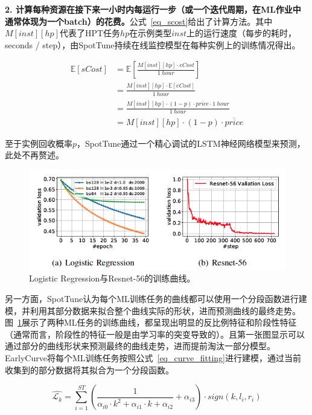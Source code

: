 \textbf{2. 计算每种资源在接下来一小时内每运行一步（或一个迭代周期，在ML作业中通常体现为一个batch）的花费。}公式~\ref{eq_scost}给出了计算方法。其中$M[inst][hp]$代表了HPT任务$hp$在示例类型$inst$上的运行速度（每步的耗时，seconds / step），由SpotTune持续在线监控模型在每种实例上的训练情况得出。

\begin{equation}\label{eq_scost}
	\begin{aligned}
		\mathbb{E}\left[sCost\right] &= \mathbb{E}\left[\frac{M[inst][hp] \cdot eCost}{1\ hour}\right]  \\
		&=\frac{M[inst][hp] \cdot \mathbb{E}\left[eCost\right]}{1\ hour} \\
		&=\frac{M[inst][hp] \cdot (1-p) \cdot \overline{price} \cdot 1\ hour}{1\ hour} \\
		&=M[inst][hp] \cdot (1-p) \cdot \overline{price}
	\end{aligned}
\end{equation}

至于实例回收概率$p$，SpotTune通过一个精心调试的LSTM神经网络模型来预测，此处不再赘述。

\begin{figure}[h]
    \centerline{\includegraphics[width=\textwidth]{figures/lr-res56-loss.png}}
    \caption{Logistic Regression与Resnet-56的训练曲线。}
    \label{lr_res56_loss}
\end{figure}


另一方面，SpotTune认为每个ML训练任务的曲线都可以使用一个分段函数进行建模，并利用其部分数据来拟合整个曲线实际的形状，进而预测曲线的最终走势。图~\ref{lr_res56_loss}展示了两种ML任务的训练曲线，都呈现出明显的反比例特征和阶段性特征（通常而言，阶段性的特征一般是由学习率的突变导致的）。且第一张图显示可以通过部分的曲线形状来预测最终的曲线走势，进而提前淘汰一部分模型。EarlyCurve将每个ML训练任务按照公式~\ref{eq_curve_fitting}进行建模，通过当前收集到的部分数据将其拟合为一个分段函数。

\begin{equation}\label{eq_curve_fitting}
	\hat{\mathcal{L}_k} = \sum_{i=1}^{ST}(\frac{1}{\alpha_{i0} \cdot k^2 + \alpha_{i1} \cdot k + \alpha_{i2}} + \alpha_{i3}) \cdot sign(k, l_i, r_i)
\end{equation}

